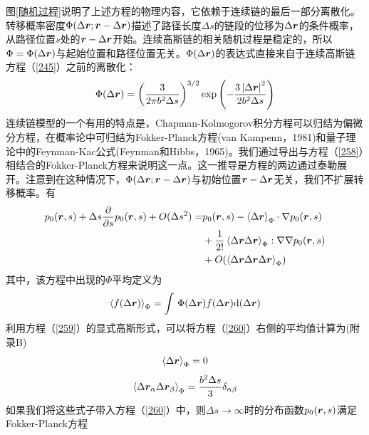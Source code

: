 图\ref{随机过程}说明了上述方程的物理内容，它依赖于连续链的最后一部分离散化。转移概率密度$\Phi(\Delta \bm{r} ;\bm{r} -\Delta \bm{r} )$描述了路径长度$\Delta s$的链段的位移为$\Delta \bm{r} $的条件概率，从路径位置$s$处的$\bm{r} -\Delta \bm{r} $开始。连续高斯链的相关随机过程是稳定的，所以$\Phi =\Phi(\Delta \bm{r} )$与起始位置和路径位置无关。$\Phi(\Delta \bm{r} )$的表达式直接来自于连续高斯链方程（\ref{245}）之前的离散化：
\begin{equation}\label{259}
\Phi(\Delta \bm{r} )=\left( \frac{3}{2\pi b^2 \Delta s} \right)^{3/2}\exp \left(- \frac{3\left| \Delta \bm{r}  \right|^2}{2b^2 \Delta s} \right) 
\end{equation}
连续链模型的一个有用的特点是，Chapman-Kolmogorov积分方程可以归结为偏微分方程，在概率论中可归结为Fokker-Planck方程(van Kampenn，1981)和量子理论中的Feynman-Kac公式(Feynman和Hibbs，1965)。我们通过导出与方程（\ref{258}）相结合的Fokker-Planck方程来说明这一点。这一推导是方程的两边通过泰勒展开。注意到在这种情况下，$\Phi(\Delta \bm{r} ;\bm{r} -\Delta \bm{r} )$与初始位置$\bm{r} -\Delta \bm{r} $无关，我们不扩展转移概率。有
\begin{equation}\label{260}
\begin{aligned}
p_0(\bm{r} ,s)+\Delta s\frac{\partial}{\partial s}p_0(\bm{r} ,s)+O(\Delta s^2)=&p_0(\bm{r} ,s)-\left \langle \Delta \bm{r}  \right \rangle _\Phi \cdot \nabla p_0 (\bm{r} ,s)\\ &+\frac{1}{2!}\left \langle \Delta \bm{r}   \Delta \bm{r}  \right \rangle _\Phi:\nabla \nabla p_0(\bm{r} ,s)\\ &+O(\left \langle \Delta \bm{r}   \Delta \bm{r}   \Delta \bm{r}  \right \rangle _\Phi)
\end{aligned}
\end{equation}
其中，该方程中出现的$\Phi$平均定义为
\begin{equation}\label{261}
\left \langle f(\Delta \bm{r} ) \right \rangle _\Phi = \int \,\Phi (\Delta \bm{r} )f(\Delta \bm{r} ) \mathrm{d}(\Delta \bm{r} )
\end{equation}
利用方程（\ref{259}）的显式高斯形式，可以将方程（\ref{260}）右侧的平均值计算为(附录B)
\begin{equation}\label{262}
\left \langle \Delta \bm{r}  \right \rangle _\Phi = 0
\end{equation}
\begin{equation}\label{263}
\left \langle \Delta \bm{r} _\alpha \Delta \bm{r} _\beta \right \rangle _\Phi = \frac{b^2 \Delta s}{3}\delta_{\alpha \beta}
\end{equation}
如果我们将这些式子带入方程（\ref{260}）中，则$\Delta s \rightarrow \infty$时的分布函数$p_0(\bm{r} ,s)$满足Fokker-Planck方程

